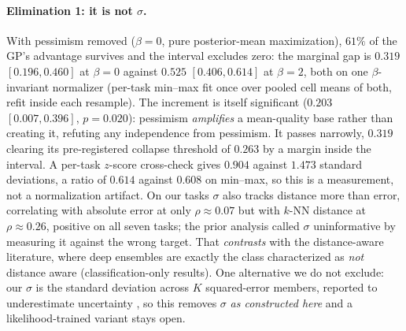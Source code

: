 \documentclass[letterpaper]{article} %
\theoremstyle{plain}
\newcommand{\mdemph}[1]{\emph{#1}}
\begin{document}
\paragraph{Elimination 1: it is not $\sigma$.} With pessimism removed ($\beta{=}0$, pure posterior-mean maximization), $61\%$ of the GP's advantage survives and the interval excludes zero: the marginal gap is $0.319$ $[0.196,0.460]$ at $\beta{=}0$ against $0.525$ $[0.406,0.614]$ at $\beta{=}2$, both on one $\beta$-invariant normalizer (per-task min--max fit once over pooled cell means of both, refit inside each resample). The increment is itself significant ($0.203$ $[0.007,0.396]$, $p{=}0.020$): pessimism \mdemph{amplifies} a mean-quality base rather than creating it, refuting any independence from pessimism. It passes narrowly, $0.319$ clearing its pre-registered collapse threshold of $0.263$ by a margin inside the interval. A per-task $z$-score cross-check gives $0.904$ against $1.473$ standard deviations, a ratio of $0.614$ against $0.608$ on min--max, so this is a measurement, not a normalization artifact. On our tasks $\sigma$ also tracks distance more than error, correlating with absolute error at only $\rho\approx0.07$ but with $k$-NN distance at $\rho\approx0.26$, positive on all seven tasks; the prior analysis called $\sigma$ uninformative by measuring it against the wrong target. That \mdemph{contrasts} with the distance-aware literature, where deep ensembles are exactly the class characterized as \mdemph{not} distance aware \citep{liu2020sngp,vanamersfoort2020duq} (classification-only results). One alternative we do not exclude: our $\sigma$ is the standard deviation across $K$ squared-error members, reported to underestimate uncertainty \citep{lakshminarayanan2017ensembles}, so this removes $\sigma$ \mdemph{as constructed here} and a likelihood-trained variant stays open.
\end{document}
